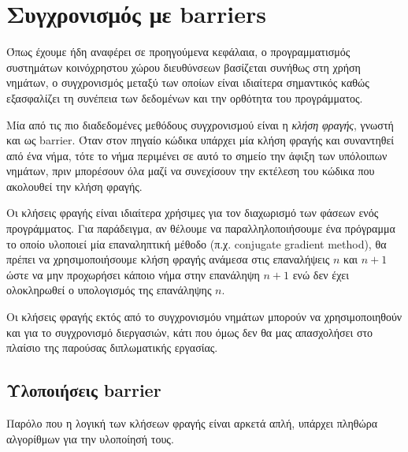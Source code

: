 \chapter{Συγχρονισμός με barriers}
\label{ch:Synchronization with Barriers}
Όπως έχουμε ήδη αναφέρει σε προηγούμενα κεφάλαια, ο προγραμματισμός συστημάτων κοινόχρηστου χώρου διευθύνσεων βασίζεται συνήθως στη χρήση νημάτων, ο συγχρονισμός μεταξύ των οποίων είναι ιδιαίτερα σημαντικός καθώς εξασφαλίζει τη συνέπεια των δεδομένων και την ορθότητα του προγράμματος.

Μία από τις πιο διαδεδομένες μεθόδους συγχρονισμού είναι η \textit{κλήση φραγής}, γνωστή και ως barrier. Όταν στον πηγαίο κώδικα υπάρχει μία κλήση φραγής και συναντηθεί από ένα νήμα, τότε το νήμα περιμένει σε αυτό το σημείο την άφιξη των υπόλοιπων νημάτων, πριν μπορέσουν όλα μαζί να συνεχίσουν την εκτέλεση του κώδικα που ακολουθεί την κλήση φραγής.


Οι κλήσεις φραγής είναι ιδιαίτερα χρήσιμες για τον διαχωρισμό των φάσεων ενός προγράμματος. Για παράδειγμα, αν θέλουμε να παραλληλοποιήσουμε ένα πρόγραμμα το οποίο υλοποιεί μία επαναληπτική μέθοδο (π.χ. conjugate gradient method), θα πρέπει να χρησιμοποιήσουμε κλήση φραγής ανάμεσα στις επαναλήψεις $n$ και $n+1$ ώστε να μην προχωρήσει κάποιο νήμα στην επανάληψη $n+1$ ενώ δεν έχει ολοκληρωθεί ο υπολογισμός της επανάληψης $n$.

Οι κλήσεις φραγής εκτός από το συγχρονισμόυ νημάτων μπορούν να χρησιμοποιηθούν και για το συγχρονισμό διεργασιών, κάτι που όμως δεν θα μας απασχολήσει στο πλαίσιο της παρούσας διπλωματικής εργασίας.

\section{Υλοποιήσεις barrier}
\label{sec:Barrier Implementations}
Παρόλο που η λογική των κλήσεων φραγής είναι αρκετά απλή, υπάρχει πληθώρα αλγορίθμων για την υλοποίησή τους. 

